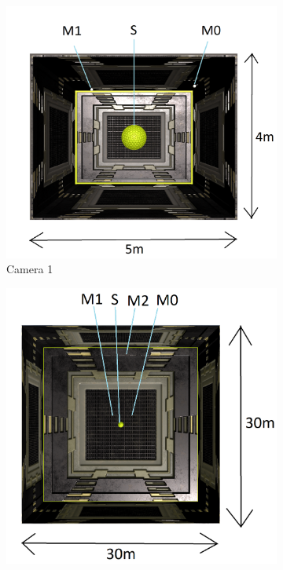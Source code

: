 	\begin{figure}[!htb]%
		\begin{subfigure}[b]{.3\textwidth}
			\centering
			\includegraphics[width=1\linewidth]{imagini/roomA.png} 
			\caption{Camera 1}
			\label{fig:sub-fig}
		\end{subfigure}
		\hfill
		\begin{subfigure}[b]{.3\textwidth}
			\centering
			\includegraphics[width=1\linewidth]{imagini/roomB.png}

\end{subfigure}
\end{figure}
